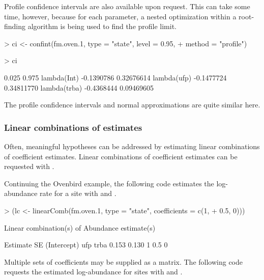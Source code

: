\documentclass[article,shortnames]{jss}
\begin{document}
Profile confidence intervals are also available upon request.  This
can take some time, however, because for each parameter, a nested
optimization within a root-finding algorithm is being used to find the
profile limit.

\begin{Schunk}
\begin{Sinput}
> ci <- confint(fm.oven.1, type = "state", level = 0.95, 
+     method = "profile")
\end{Sinput}
\end{Schunk}
\begin{Schunk}
\begin{Sinput}
> ci
\end{Sinput}
\begin{Soutput}
                  0.025      0.975
lambda(Int)  -0.1390786 0.32676614
lambda(ufp)  -0.1477724 0.34811770
lambda(trba) -0.4368444 0.09469605
\end{Soutput}
\end{Schunk}

The profile confidence intervals and normal approximations are quite
similar here.

\subsubsection{Linear combinations of estimates}

Often, meaningful hypotheses can be addressed by estimating linear
combinations of coefficient estimates.  Linear combinations of coefficient
estimates can be requested with .

Continuing the Ovenbird example, the following code estimates the
log-abundance rate for a site with  and .

\begin{Schunk}
\begin{Sinput}
> (lc <- linearComb(fm.oven.1, type = "state", coefficients = c(1, 
+     0.5, 0)))
\end{Sinput}
\begin{Soutput}
Linear combination(s) of Abundance estimate(s)

 Estimate    SE (Intercept) ufp trba
    0.153 0.130           1 0.5    0
\end{Soutput}
\end{Schunk}

Multiple sets of coefficients may be supplied as a matrix.  The
following code requests the estimated log-abundance for sites with
 and .
\end{document}
